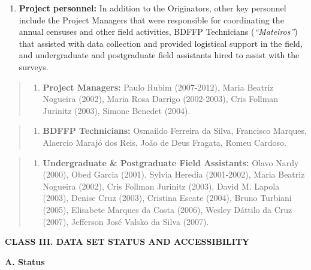 \documentclass[
  12pt,
  man, donotrepeattitle]{apa6}
\providecommand{\tightlist}{%
  \setlength{\itemsep}{0pt}\setlength{\parskip}{0pt}}
\begin{document}
\begin{enumerate}
\def\labelenumi{\arabic{enumi}.}
\setcounter{enumi}{2}
\tightlist
\item
  \textbf{Project personnel:} In addition to the Originators, other key personnel include the Project Managers that were responsible for coordinating the annual censuses and other field activities, BDFFP Technicians (\emph{``Mateiros''}) that assisted with data collection and provided logistical support in the field, and undergraduate and postgraduate field assistants hired to assist with the surveys.
\end{enumerate}

\begin{quote}
\begin{enumerate}
\def\labelenumi{\alph{enumi}.}
\tightlist
\item
  \textbf{Project Managers:} Paulo Rubim (2007-2012), Maria Beatriz Nogueira (2002), Maria Rosa Darrigo (2002-2003), Cris Follman Jurinitz (2003), Simone Benedet (2004).
\end{enumerate}
\end{quote}

\begin{quote}
\begin{enumerate}
\def\labelenumi{\alph{enumi}.}
\setcounter{enumi}{1}
\tightlist
\item
  \textbf{BDFFP Technicians:} Osmaildo Ferreira da Silva, Francisco Marques, Alaercio Marajó dos Reis, João de Deus Fragata, Romeu Cardoso.
\end{enumerate}
\end{quote}

\begin{quote}
\begin{enumerate}
\def\labelenumi{\alph{enumi}.}
\setcounter{enumi}{2}
\tightlist
\item
  \textbf{Undergraduate \& Postgraduate Field Assistants:} Olavo Nardy (2000), Obed Garcia (2001), Sylvia Heredia (2001-2002), Maria Beatriz Nogueira (2002), Cris Follman Jurinitz (2003), David M. Lapola (2003), Denise Cruz (2003), Cristina Escate (2004), Bruno Turbiani (2005), Elisabete Marques da Costa (2006), Wesley Dáttilo da Cruz (2007), Jefferson José Valsko da Silva (2007).
\end{enumerate}
\end{quote}

\noindent  
\textbf{CLASS III. DATA SET STATUS AND ACCESSIBILITY}

\noindent  
\textbf{A. Status}
\end{document}
